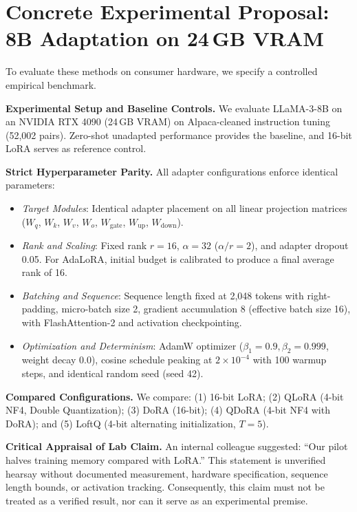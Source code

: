 \documentclass[11pt,a4paper]{article}
\begin{document}
\section{Concrete Experimental Proposal: 8B Adaptation on 24\,GB VRAM}

To evaluate these methods on consumer hardware, we specify a controlled empirical benchmark.

\textbf{Experimental Setup and Baseline Controls.} We evaluate LLaMA-3-8B on an NVIDIA RTX 4090 (24\,GB VRAM) on Alpaca-cleaned instruction tuning (52,002 pairs). Zero-shot unadapted performance provides the baseline, and 16-bit LoRA serves as reference control.

\textbf{Strict Hyperparameter Parity.} All adapter configurations enforce identical parameters:
\begin{itemize}
    \item \textit{Target Modules}: Identical adapter placement on all linear projection matrices ($W_q$, $W_k$, $W_v$, $W_o$, $W_{\text{gate}}$, $W_{\text{up}}$, $W_{\text{down}}$).
    \item \textit{Rank and Scaling}: Fixed rank $r=16$, $\alpha=32$ ($\alpha/r=2$), and adapter dropout 0.05. For AdaLoRA, initial budget is calibrated to produce a final average rank of 16.
    \item \textit{Batching and Sequence}: Sequence length fixed at 2,048 tokens with right-padding, micro-batch size 2, gradient accumulation 8 (effective batch size 16), with FlashAttention-2 and activation checkpointing.
    \item \textit{Optimization and Determinism}: AdamW optimizer ($\beta_1=0.9, \beta_2=0.999$, weight decay 0.0), cosine schedule peaking at $2 \times 10^{-4}$ with 100 warmup steps, and identical random seed (seed 42).
\end{itemize}

\textbf{Compared Configurations.} We compare: (1) 16-bit LoRA; (2) QLoRA (4-bit NF4, Double Quantization); (3) DoRA (16-bit); (4) QDoRA (4-bit NF4 with DoRA); and (5) LoftQ (4-bit alternating initialization, $T=5$).

\textbf{Critical Appraisal of Lab Claim.} An internal colleague suggested: ``Our pilot halves training memory compared with LoRA.'' This statement is unverified hearsay without documented measurement, hardware specification, sequence length bounds, or activation tracking. Consequently, this claim must not be treated as a verified result, nor can it serve as an experimental premise.
\end{document}
